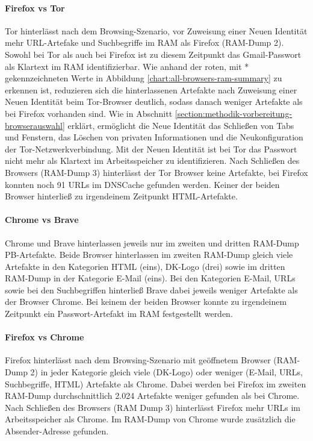 \paragraph*{Firefox vs Tor}
Tor hinterlässt nach dem Browsing-Szenario, vor Zuweisung einer \glqq{}Neuen Identität\grqq{} mehr URL-Artefake und Suchbegriffe im RAM als Firefox (RAM-Dump 2). 
Sowohl bei Tor als auch bei Firefox ist zu diesem Zeitpunkt das Gmail-Passwort als Klartext im RAM identifizierbar.
Wie anhand der roten, mit * gekennzeichneten Werte in Abbildung \ref{chart:all-browsers-ram-summary} zu erkennen ist, 
reduzieren sich die hinterlassenen Artefakte nach Zuweisung einer \glqq{}Neuen Identität\grqq{} beim Tor-Browser deutlich, sodass danach weniger Artefakte als bei Firefox vorhanden sind.
Wie in Abschnitt \ref{section:methodik-vorbereitung-browserauswahl} erklärt, ermöglicht die \glqq{}Neue Identität\grqq{} das Schließen von Tabs und Fenstern, das Löschen von privaten Informationen und die Neukonfiguration der Tor-Netzwerkverbindung.
Mit der \glqq{}Neuen Identität\grqq{} ist bei Tor das Passwort nicht mehr als Klartext im Arbeitsspeicher zu identifizieren.
Nach Schließen des Browsers (RAM-Dump 3) hinterlässt der Tor Browser keine Artefakte, bei Firefox konnten noch 91 URLs im DNSCache gefunden werden. 
Keiner der beiden Browser hinterließ zu irgendeinem Zeitpunkt HTML-Artefakte.

\paragraph*{Chrome vs Brave}
Chrome und Brave hinterlassen jeweils nur im zweiten und dritten RAM-Dump PB-Artefakte. Beide Browser hinterlassen im zweiten RAM-Dump gleich viele Artefakte in den Kategorien HTML (eins), DK-Logo (drei) sowie im dritten RAM-Dump in der Kategorie E-Mail (eins). Bei den Kategorien E-Mail, URLs sowie bei den Suchbegriffen hinterließ Brave dabei jeweils weniger Artefakte als der Browser Chrome. Bei keinem der beiden Browser konnte zu irgendeinem Zeitpunkt ein Passwort-Artefakt im RAM festgestellt werden.

\paragraph*{Firefox vs Chrome}
Firefox hinterlässt nach dem Browsing-Szenario mit geöffnetem Browser (RAM-Dump 2) in jeder Kategorie gleich viele (DK-Logo) oder weniger (E-Mail, URLs, Suchbegriffe, HTML) Artefakte als Chrome.
Dabei werden bei Firefox im zweiten RAM-Dump durchschnittlich 2.024 Artefakte weniger gefunden als bei Chrome.
Nach Schließen des Browsers (RAM Dump 3) hinterlässt Firefox mehr URLs im Arbeitsspeicher als Chrome. Im RAM-Dump von Chrome wurde zusätzlich die Absender-Adresse gefunden.

